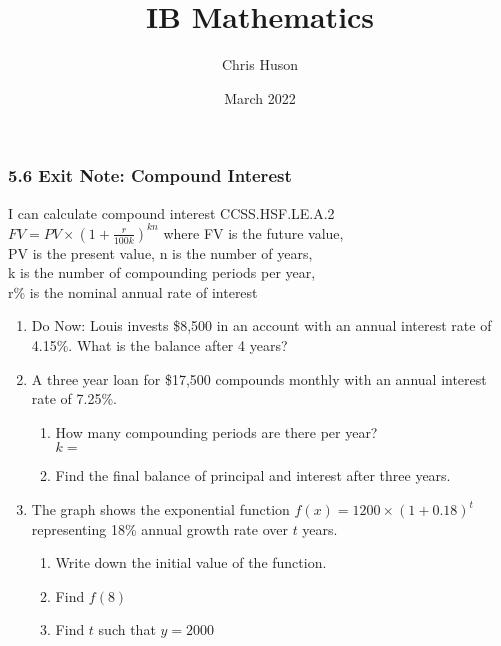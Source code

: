 \documentclass[12pt, twoside]{article}
\title{IB Mathematics}
\author{Chris Huson}
\date{March 2022}
\begin{document}
\subsubsection*{5.6 Exit Note: Compound Interest}
I can calculate compound interest \hfill CCSS.HSF.LE.A.2 \\[0.5cm]
$\displaystyle FV=PV \times \left(1+\frac{r}{100k} \right)^{kn}$
where FV is the future value,\\[0.25cm]
PV is the present value, n is the number of years, \\
 k is the number of compounding periods per year, \\
 r\% is the nominal annual rate of interest

\begin{enumerate}
\item Do Now: Louis invests \$8,500 in an account with an annual interest rate of 4.15\%. What is the balance after 4 years? \vspace{2cm}

\item A three year loan for \$17,500 compounds monthly with an annual interest rate of 7.25\%.
\begin{enumerate}[itemsep=0.5cm]
    \item How many compounding periods are there per year? \\[0.25cm]
    $k=$
    \item Find the final balance of principal and interest after three years.
\end{enumerate} \vspace{2cm}

\item The graph shows the exponential function $\displaystyle f(x)=1200 \times \left( 1+0.18 \right)^t$ representing 18\% annual growth rate over $t$ years.
\begin{multicols}{2}
    \begin{enumerate}[itemsep=1cm]
        \item Write down the initial value of the function.
        \item Find $f(8)$
        \item Find $t$ such that $y=2000$
    \end{enumerate}
    \begin{center}
\end{center}
\end{multicols}
\end{enumerate}
\end{document}
